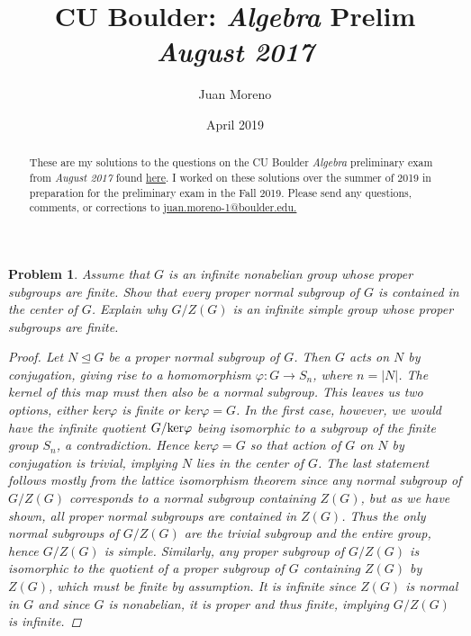\documentclass[11pt]{article}
\newcommand{\1}{\textbf{1}}
\newtheorem{prob}{Problem}
\begin{document}
\title{\LARGE \textbf{CU Boulder: \textit{Algebra} %
Prelim \\ \textit{August 2017}} %
\vspace{-.75cm}}%
\author{Juan Moreno
} 
\date{\vspace{-0.45cm}April 2019} %

 
\maketitle

\renewcommand{\abstractname}{\vspace{-\baselineskip}}
\begin{abstract}
\noindent These are my solutions to the questions on the CU Boulder \textit{Algebra} preliminary exam from \textit{August 2017} found  \href{http://math.colorado.edu/documents/graduate/prelim/Algebra_Aug_2017.pdf}{here}. I worked on these solutions over the summer of 2019 in preparation for the preliminary exam in the Fall 2019. Please send any questions, comments, or corrections to \href{mailto: juan.moreno-1@boulder.edu}{juan.moreno-1@boulder.edu.} \\
\end{abstract}

\begin{prob}
Assume that $G$ is an infinite nonabelian group whose proper subgroups are finite. Show that every proper normal subgroup of $G$ is contained in the center of $G$. Explain why $G/Z(G)$ is an infinite simple group whose proper subgroups are finite. 

\begin{proof}
Let $N\trianglelefteq G$ be a proper normal subgroup of $G$. Then $G$ acts on $N$ by conjugation, giving rise to a homomorphism $\varphi:G\rightarrow S_n$, where $n = |N|$. The kernel of this map must then also be a normal subgroup. This leaves us two options, either ker$\varphi$ is finite or ker$\varphi = G$. In the first case, however, we would have the infinite quotient $G/\textnormal{ker}\varphi$ being isomorphic to a subgroup of the finite group $S_n$, a contradiction. Hence ker$\varphi = G$ so that action of $G$ on $N$ by conjugation is trivial, implying $N$ lies in the center of $G$. The last statement follows mostly from the lattice isomorphism theorem since any normal subgroup of $G/Z(G)$ corresponds to a normal subgroup containing $Z(G)$, but as we have shown, all proper normal subgroups are contained in $Z(G)$. Thus the only normal subgroups of $G/Z(G)$ are the trivial subgroup and the entire group, hence $G/Z(G)$ is simple. Similarly, any proper subgroup of $G/Z(G)$ is isomorphic to the quotient of a proper subgroup of $G$ containing $Z(G)$ by $Z(G)$, which must be finite by assumption. It is infinite since $Z(G)$ is normal in $G$ and since $G$ is nonabelian, it is proper and thus finite, implying $G/Z(G)$ is infinite. 
\end{proof}
\end{prob}
\end{document}
